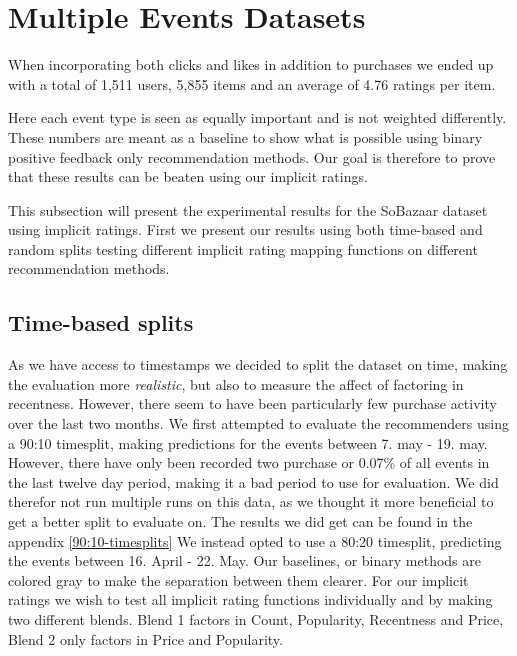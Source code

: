 \section{Multiple Events Datasets}

When incorporating both clicks and likes in addition to purchases we ended up with a total of 1,511 users, 5,855 items
and an average of 4.76 ratings per item.

Here each event type is seen as equally important and is not weighted differently.
These numbers are meant as a baseline to show what is possible using binary positive feedback only recommendation methods.
Our goal is therefore to prove that these results can be beaten using our implicit ratings.

This subsection will present the experimental results for the SoBazaar dataset using implicit ratings. First we present
our results using both time-based and random splits testing different implicit rating mapping functions on different recommendation methods.

\subsection{Time-based splits}

As we have access to timestamps we decided to split the dataset on time, making the evaluation more \textit{realistic}, but also to measure the
affect of factoring in recentness. However, there seem to have been particularly few purchase activity over the last two months. We first attempted to evaluate the recommenders
using a 90:10 timesplit, making predictions for the events between 7. may - 19. may. However, there have only been recorded two purchase or 0.07\% of
all events in the last twelve day period, making it a bad period to use for evaluation. We did therefor not run multiple runs on this
data, as we thought it more beneficial to get a better split to evaluate on. The results we did get can be found in the appendix \ref{90:10-timesplits}
We instead opted to use a 80:20 timesplit, predicting the events between 16. April - 22. May. Our baselines, or binary methods are colored gray to
make the separation between them clearer. For our implicit ratings we wish to test all implicit rating functions individually and by making two different blends.
Blend 1 factors in Count, Popularity, Recentness and Price, Blend 2 only factors in Price and Popularity.

